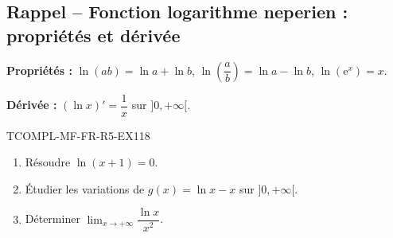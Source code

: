 

\subsection*{Rappel -- Fonction logarithme neperien : propriétés et dérivée}

\textbf{Propriétés :} $\ln(ab) = \ln a + \ln b$, $\ln\left(\dfrac{a}{b}\right) = \ln a - \ln b$, $\ln(\mathrm{e}^x) = x$.

\textbf{Dérivée :} $(\ln x)' = \dfrac{1}{x}$ sur $]0, +\infty[$.

\begin{exercice}{TCOMPL-MF-FR-R5-EX1}{1}{8}
\begin{enumerate}
  \item Résoudre $\ln(x + 1) = 0$.
  \item Étudier les variations de $g(x) = \ln x - x$ sur $]0, +\infty[$.
  \item Déterminer $\lim_{x \to +\infty} \dfrac{\ln x}{x^2}$.
\end{enumerate}
\end{exercice}

